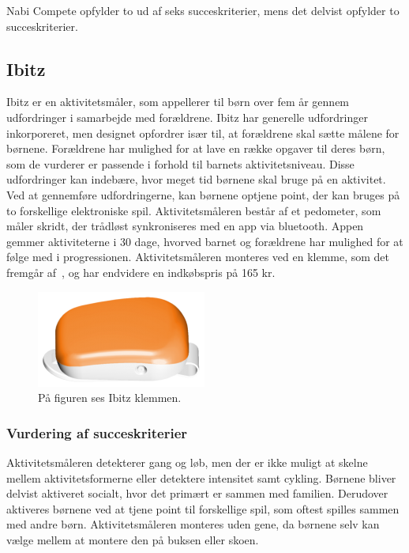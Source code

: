 Nabi Compete opfylder to ud af seks succeskriterier, mens det delvist opfylder to succeskriterier.

\subsection{Ibitz}
Ibitz er en aktivitetsmåler, som appellerer til børn over fem år gennem udfordringer i samarbejde med forældrene. Ibitz har generelle udfordringer inkorporeret, men designet opfordrer især til, at forældrene skal sætte målene for børnene. Forældrene har mulighed for at lave en række opgaver til deres børn, som de vurderer er passende i forhold til barnets aktivitetsniveau. \newline
Disse udfordringer kan indebære, hvor meget tid børnene skal bruge på en aktivitet. Ved at gennemføre udfordringerne, kan børnene optjene point, der kan bruges på to forskellige elektroniske spil. \newline
Aktivitetsmåleren består af et pedometer, som måler skridt, der trådløst synkroniseres med en app via bluetooth. Appen gemmer aktiviteterne i 30 dage, hvorved barnet og forældrene har mulighed for at følge med i progressionen. Aktivitetsmåleren monteres ved en klemme, som det fremgår af~, og har endvidere en indkøbspris på 165 kr. \citep{Ibitz_features2016}

\begin{figure}[H]
	\centering
	\includegraphics[scale=0.9]{figures/aProblemanalyse/ibitz.png}
	\caption{På figuren ses Ibitz klemmen.\citep{Ibitz_features2016}}
	\label{fig:ibitz}
\end{figure}

\subsubsection{Vurdering af succeskriterier}
Aktivitetsmåleren detekterer gang og løb, men der er ikke muligt at skelne mellem aktivitetsformerne eller detektere intensitet samt cykling. Børnene bliver delvist aktiveret socialt, hvor det primært er sammen med familien. Derudover aktiveres børnene ved at tjene point til forskellige spil, som oftest spilles sammen med andre børn. Aktivitetsmåleren monteres uden gene, da børnene selv kan vælge mellem at montere den på buksen eller skoen.  


